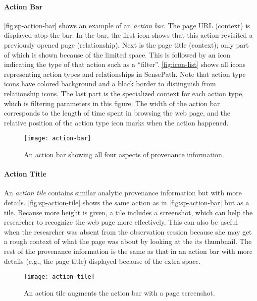 \paragraph{Action Bar}
\autoref{fig:sp-action-bar} shows an example of an \textit{action bar}. The page URL (context) is displayed atop the bar. In the bar, the first icon shows that this action revisited a previously opened page (relationship). Next is the page title (context); only part of which is shown because of the limited space. This is followed by an icon indicating the type of that action such as a ``filter''. \autoref{fig:icon-list} shows all icons representing action types and relationships in SensePath. Note that action type icons have colored background and a black border to distinguish from relationship icons. The last part is the specialized context for each action type, which is filtering parameters in this figure. The width of the action bar corresponds to the length of time spent in browsing the web page, and the relative position of the action type icon marks when the action happened.

\begin{figure}[!htb]
\centering
\texttt{[image: action-bar]}
\caption{An action bar showing all four aspects of provenance information.}
\label{fig:sp-action-bar}
\end{figure}

\paragraph{Action Title}
An \emph{action tile} contains similar analytic provenance information but with more details. \autoref{fig:sp-action-tile} shows the same action as in \autoref{fig:sp-action-bar} but as a tile. Because more height is given, a tile includes a screenshot, which can help the researcher to recognize the web page more effectively. This can also be useful when the researcher was absent from the observation session because she may get a rough context of what the page was about by looking at the its thumbnail. The rest of the provenance information is the same as that in an action bar with more details (e.g., the page title) displayed because of the extra space.

\begin{figure}[!htb]
\centering
\texttt{[image: action-tile]}
\caption{An action tile augments the action bar with a page screenshot.}
\label{fig:sp-action-tile}
\end{figure}

